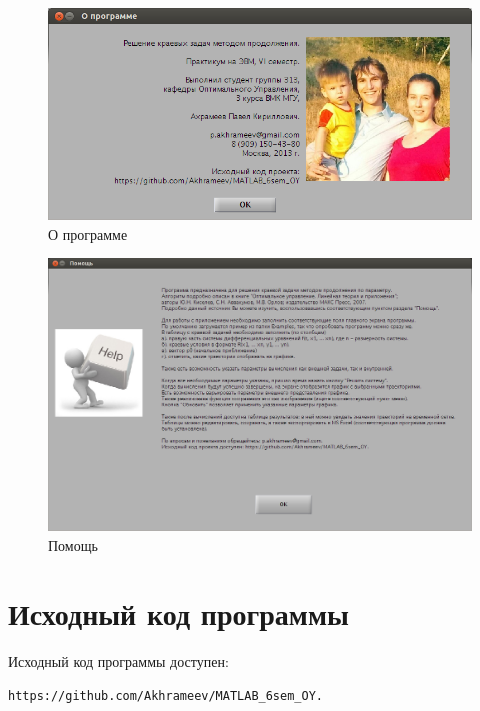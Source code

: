 \begin{figure}[h!] 
\begin{center}
\includegraphics[scale=0.2]{aboutWindow.jpeg}
\end{center}
\caption{О программе}
\label{aboutWindow_pic}
\end{figure}

\begin{figure}[h!] 
\begin{center}
\includegraphics[scale=0.2]{helpWindow.jpeg}
\end{center}
\caption{Помощь}
\label{helpWindow_pic}
\end{figure}
\newpage
\section{Исходный код программы}

Исходный код программы доступен: 
\begin{lstlisting}
https://github.com/Akhrameev/MATLAB_6sem_OY.
\end{lstlisting}
